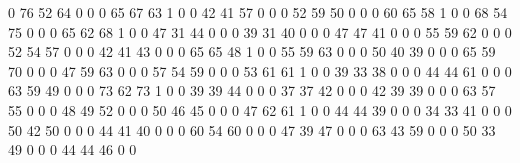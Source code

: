 \documentclass[a4paper,10pt]{article}
\begin{document}
\begin{eulernotebook}
\begin{eulercomment}
\begin{eulercomment}
\begin{eulercomment}
\begin{eulercomment}
\begin{eulercomment}
\begin{eulercomment}
\begin{eulercomment}
\begin{eulercomment}
\begin{euleroutput}
           0        76        52        64         0           0
           0        65        67        63         1           0
           0        42        41        57         0           0
           0        52        59        50         0           0
           0        60        65        58         1           0
           0        68        54        75         0           0
           0        65        62        68         1           0
           0        47        31        44         0           0
           0        39        31        40         0           0
           0        47        47        41         0           0
           0        55        59        62         0           0
           0        52        54        57         0           0
           0        42        41        43         0           0
           0        65        65        48         1           0
           0        55        59        63         0           0
           0        50        40        39         0           0
           0        65        59        70         0           0
           0        47        59        63         0           0
           0        57        54        59         0           0
           0        53        61        61         1           0
           0        39        33        38         0           0
           0        44        44        61         0           0
           0        63        59        49         0           0
           0        73        62        73         1           0
           0        39        39        44         0           0
           0        37        37        42         0           0
           0        42        39        39         0           0
           0        63        57        55         0           0
           0        48        49        52         0           0
           0        50        46        45         0           0
           0        47        62        61         1           0
           0        44        44        39         0           0
           0        34        33        41         0           0
           0        50        42        50         0           0
           0        44        41        40         0           0
           0        60        54        60         0           0
           0        47        39        47         0           0
           0        63        43        59         0           0
           0        50        33        49         0           0
           0        44        44        46         0           0

\end{euleroutput}
\end{eulercomment}
\end{eulercomment}
\end{eulercomment}
\end{eulercomment}
\end{eulercomment}
\end{eulercomment}
\end{eulercomment}
\end{eulercomment}
\end{eulernotebook}
\end{document}
